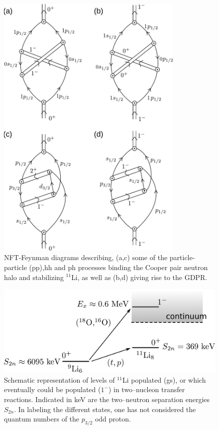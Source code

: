 \begin{subappendices}
\begin{figure}
\includegraphics[width=0.8\textwidth]{C8/figsC8/Nobel40Years-4b.pdf}
\caption{NFT-Feynman diagrams describing, (a,c) some of the particle-particle (pp),hh and ph processes binding the Cooper pair neutron halo 
and stabilizing $^{11}$Li, as well as  (b,d) giving rise to the GDPR.}\label{fig6.I.2}
\end{figure}

\begin{figure}
\includegraphics[width=\textwidth]{C8/figsC8/figa3_newnew.pdf}
\caption{ Schematic representation of levels of $^{11}$Li populated (gs), or which  eventually could be populated ($1^-$)  in two--nucleon transfer reactions. Indicated in keV are the two--neutron
separation energies $S_{2n}$. In labeling the different states, one has not considered the quantum numbers of the $p_{3/2}$ odd proton. }\label{fig6.I.3} 
\end{figure}


\end{subappendices}
